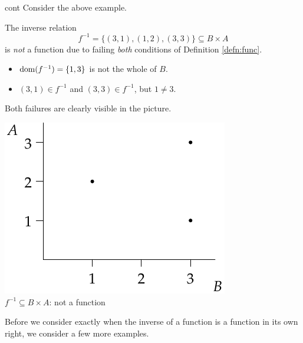 \begin{example*}{cont}{}
	Consider the above example.\par
	\begin{minipage}[t]{0.62\linewidth}\vspace{0pt}
		The inverse relation
		\[
			f^{-1}=\{(3,1),(1,2),(3,3)\}\subseteq B\times A
		\]
		is \emph{not} a function due to failing \emph{both} conditions of Definition \ref{defn:func}.
		\begin{itemize}
		  \item $\operatorname{dom}(f^{-1})=\{1,3\}$ is not the whole of $B$.
		  \item $(3,1)\in f^{-1}$ and $(3,3)\in f^{-1}$, but $1\neq 3$.
		\end{itemize}
		Both failures are clearly visible in the picture.
	\end{minipage}
	\hfill
	\begin{minipage}[t]{0.33\linewidth}\vspace{0pt}
		\centering
		\includegraphics[width=\textwidth]{relations-19-reln1}\\
		$f^{-1}\subseteq B\times A$: not a function
	\end{minipage}
\end{example*}

Before we consider exactly when the inverse of a function is a function in its own right, we consider a few more examples.


